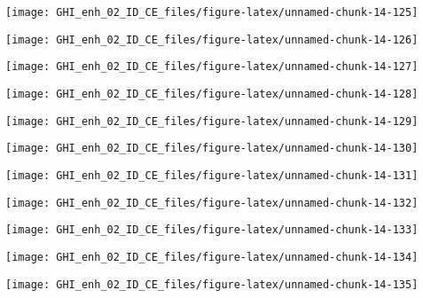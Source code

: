 \documentclass[
  10pt,
  a4paper,oneside]{article}
\begin{document}
\begin{center}\texttt{[image: GHI\_enh\_02\_ID\_CE\_files/figure-latex/unnamed-chunk-14-125]} \end{center}

\begin{center}\texttt{[image: GHI\_enh\_02\_ID\_CE\_files/figure-latex/unnamed-chunk-14-126]} \end{center}

\begin{center}\texttt{[image: GHI\_enh\_02\_ID\_CE\_files/figure-latex/unnamed-chunk-14-127]} \end{center}

\begin{center}\texttt{[image: GHI\_enh\_02\_ID\_CE\_files/figure-latex/unnamed-chunk-14-128]} \end{center}

\begin{center}\texttt{[image: GHI\_enh\_02\_ID\_CE\_files/figure-latex/unnamed-chunk-14-129]} \end{center}

\begin{center}\texttt{[image: GHI\_enh\_02\_ID\_CE\_files/figure-latex/unnamed-chunk-14-130]} \end{center}

\begin{center}\texttt{[image: GHI\_enh\_02\_ID\_CE\_files/figure-latex/unnamed-chunk-14-131]} \end{center}

\begin{center}\texttt{[image: GHI\_enh\_02\_ID\_CE\_files/figure-latex/unnamed-chunk-14-132]} \end{center}

\begin{center}\texttt{[image: GHI\_enh\_02\_ID\_CE\_files/figure-latex/unnamed-chunk-14-133]} \end{center}

\begin{center}\texttt{[image: GHI\_enh\_02\_ID\_CE\_files/figure-latex/unnamed-chunk-14-134]} \end{center}

\begin{center}\texttt{[image: GHI\_enh\_02\_ID\_CE\_files/figure-latex/unnamed-chunk-14-135]} \end{center}
\end{document}
